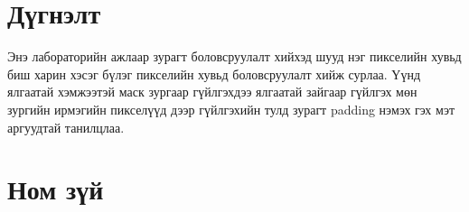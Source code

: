 \documentclass[a4paper]{article}
\begin{document}
\section{Дүгнэлт}
Энэ лабораторийн ажлаар зурагт боловсруулалт хийхэд шууд нэг пикселийн хувьд биш харин хэсэг бүлэг пикселийн хувьд боловсруулалт хийж сурлаа. Үүнд ялгаатай хэмжээтэй маск зургаар гүйлгэхдээ ялгаатай зайгаар гүйлгэх мөн зургийн ирмэгийн пикселүүд дээр гүйлгэхийн тулд зурагт padding нэмэх гэх мэт аргуудтай танилцлаа.
\section{Ном зүй}
\printbibliography[heading=none]
\end{document}
